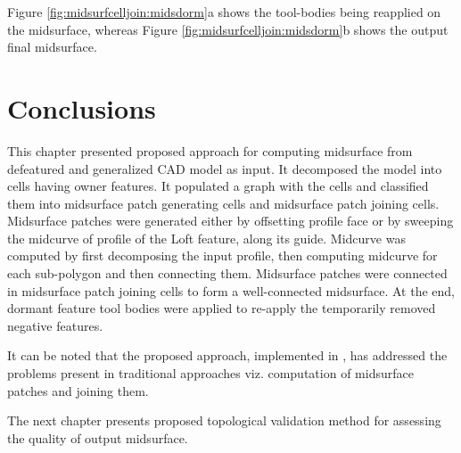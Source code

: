 


 Figure \ref{fig:midsurfcelljoin:midsdorm}a shows the tool-bodies being reapplied on the midsurface, whereas Figure \ref{fig:midsurfcelljoin:midsdorm}b shows the output final midsurface.


\section{Conclusions}

This chapter presented proposed approach for computing midsurface from defeatured and generalized CAD model as input. It decomposed the model into cells having owner features. It populated a graph with the cells and classified them into midsurface patch generating cells and midsurface patch joining cells. Midsurface patches were generated either by offsetting profile face or by sweeping the midcurve of profile of the Loft feature, along its guide. Midcurve was computed by first decomposing the input profile, then computing midcurve for each sub-polygon and then connecting them. Midsurface patches were connected in midsurface patch joining cells to form a well-connected midsurface. At the end, dormant feature tool bodies were applied to re-apply the temporarily removed negative features.

It can be noted that the proposed approach, implemented in \mysystemname, has addressed the problems present in traditional approaches viz. computation of midsurface patches and joining them. 

The next chapter presents proposed topological validation method for assessing the quality of output midsurface.

%
%
%


